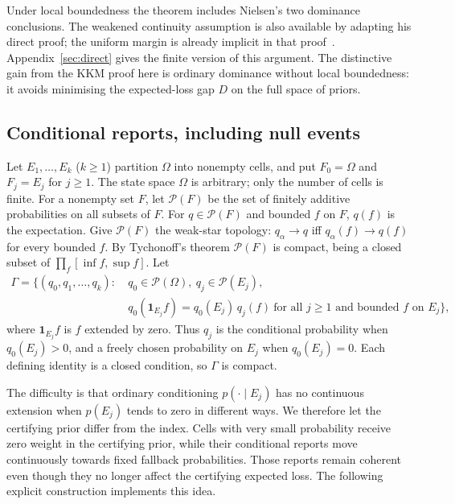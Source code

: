 \documentclass[11pt]{article}
\theoremstyle{definition}
\theoremstyle{remark}
\newcommand{\PP}{\mathcal P}
\newcommand{\one}{\mathbf 1}
\begin{document}
Under local boundedness the theorem includes Nielsen's two dominance conclusions. The weakened continuity assumption is also available by adapting his direct proof; the uniform margin is already implicit in that proof~\cite[Appendix~C, (9)]{Nielsen}. Appendix~\ref{sec:direct} gives the finite version of this argument. The distinctive gain from the KKM proof here is ordinary dominance without local boundedness: it avoids minimising the expected-loss gap $D$ on the full space of priors.

\subsection{Conditional reports, including null events}\label{sec:conditional}
Let $E_1,\dots,E_k$ ($k\ge1$) partition $\Omega$ into nonempty cells, and put $F_0=\Omega$ and $F_j=E_j$ for $j\ge1$. The state space $\Omega$ is arbitrary; only the number of cells is finite. For a nonempty set $F$, let $\PP(F)$ be the set of finitely additive probabilities on all subsets of $F$. For $q\in\PP(F)$ and bounded $f$ on $F$, $q(f)$ is the expectation. Give $\PP(F)$ the weak-star topology: $q_\alpha\to q$ iff $q_\alpha(f)\to q(f)$ for every bounded $f$. By Tychonoff's theorem $\PP(F)$ is compact, being a closed subset of $\prod_f[\inf f,\sup f]$. Let
\[
\begin{aligned}
 \Gamma=\bigl\{(q_0,q_1,\dots,q_k):\ & q_0\in\PP(\Omega),\ q_j\in\PP(E_j),\\
 & q_0(\one_{E_j}f)=q_0(E_j)\,q_j(f)\ \text{for all }j\ge1\text{ and bounded }f\text{ on }E_j\bigr\},
\end{aligned}
\]
where $\one_{E_j}f$ is $f$ extended by zero. Thus $q_j$ is the conditional probability when $q_0(E_j)>0$, and a freely chosen probability on $E_j$ when $q_0(E_j)=0$. Each defining identity is a closed condition, so $\Gamma$ is compact.

The difficulty is that ordinary conditioning $p(\cdot\mid E_j)$ has no continuous extension when $p(E_j)$ tends to zero in different ways. We therefore let the certifying prior differ from the index. Cells with very small probability receive zero weight in the certifying prior, while their conditional reports move continuously towards fixed fallback probabilities. Those reports remain coherent even though they no longer affect the certifying expected loss. The following explicit construction implements this idea.
\end{document}
